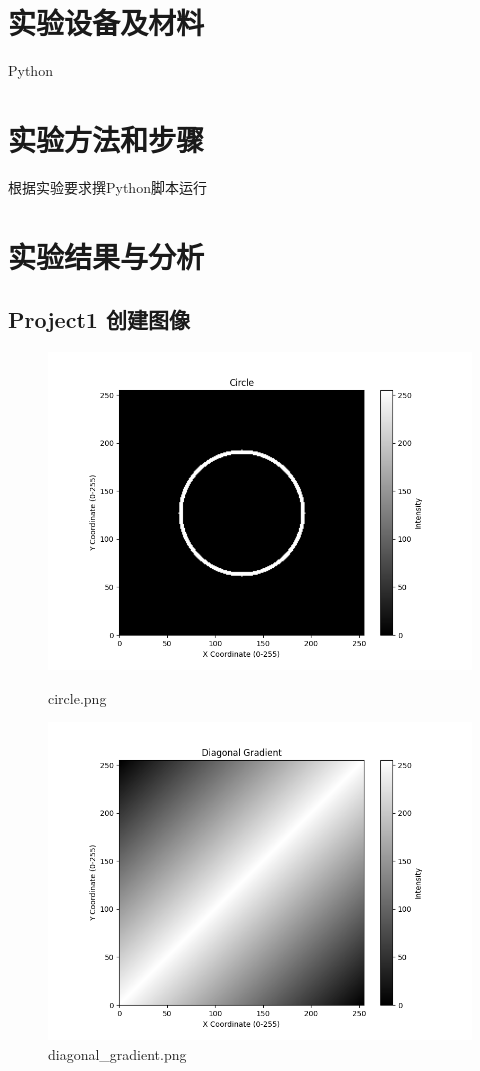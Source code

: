 \documentclass[10.5pt]{config}
\begin{document}
\section{实验设备及材料}
Python
\clearpage
\section{实验方法和步骤}
根据实验要求撰Python脚本运行
\section{实验结果与分析}
\subsection{Project1 创建图像}
\begin{figure}[!htbp]
    \centering
    \begin{minipage}[b]{0.45\linewidth}
        \centering
        \includegraphics[width=1.0\textwidth]{figures/circle.png}
        \caption{circle.png}
    \end{minipage}%
    \begin{minipage}[b]{0.45\linewidth}
        \centering
        \includegraphics[width=1.0\textwidth]{figures/diagonal_gradient.png}
        \caption{diagonal\_gradient.png}
    \end{minipage}
\end{figure}
\end{document}
